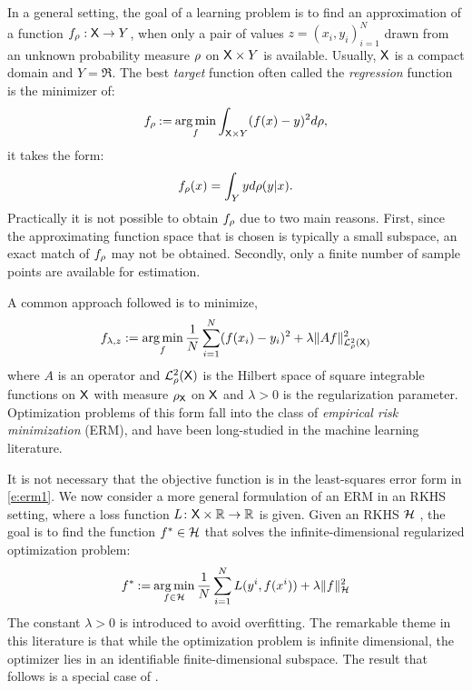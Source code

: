 In a general setting, the goal of a learning problem is to find an approximation of a function $f_\rho : {\sf X} \to Y$, when only a pair of values $z = (x_i, y_i)_{i=1}^N$ drawn from an unknown probability measure $\rho$ on ${\sf X} \times Y$ is available. Usually, ${\sf X}$ is a compact domain and $Y = \Re$. The best \textit{target} function often called the \textit{regression} function is the minimizer of:
\begin{equation}
f_\rho \mathbin{:=} \mathop{\rm arg{\,}min}_f \int_{{\sf X} \times Y} (f(x) - y) ^2 d\rho,
\end{equation}
it takes the form:
\begin{equation}
f_\pr(x) = \int_Y y d\pr(y|x).
\label{eq:f_rho}
\end{equation}
Practically it is not possible to obtain $f_\rho$ due to two main reasons. First, since the approximating function space that is chosen is typically a small subspace, an exact match of $f_\rho$ may not be obtained. Secondly, only a finite number of sample points are available for estimation.

A common approach followed is to minimize,
\begin{equation}
f_{\reg,z} := \argmin_f \frac{1}{N}\sum_{i=1}^N (f(x_i) - y_i)^2 + \reg \|A f \|^2_{\mathcal{L}_{\pr}^2(\state)}
\label{e:erm1}
\end{equation}
where $A$ is an operator and $\mathcal{L}^2_{\rho}({\sf X})$ is the Hilbert space of square integrable functions on ${\sf X}$ with measure $\rho_{\sf X}$ on ${\sf X}$ and $\lambda>0$ is the regularization parameter. Optimization problems of this form fall into the class of \textit{empirical risk minimization} (ERM), and have been long-studied in the machine learning literature.   

It is not necessary that the objective function is in the least-squares error form in \eqref{e:erm1}. We now consider a more general formulation of an ERM in an RKHS setting, where a loss function $L \colon  {\sf X}\times \mathbb{R} \to\mathbb{R}$ is given.   Given an RKHS ${\cal H}$ ,   the goal is to find the function $f^*\in{\cal H}$ that solves the infinite-dimensional regularized optimization problem:
\begin{equation}
f^* \eqdef \argmin_{f\in\clH} \frac{1}{N} \sum_{i=1}^N L(y^i,  f(x^i))     + \lambda \| f\|^2_{\clH}
\label{e:erm_rkhs}
\end{equation}
The constant $\lambda>0$ is introduced to avoid overfitting. 
The remarkable theme in this literature is that while the optimization problem is infinite dimensional,  the optimizer lies in an identifiable finite-dimensional subspace.
The result that follows is a special case of  \cite[Theorem~2]{zho08}.

